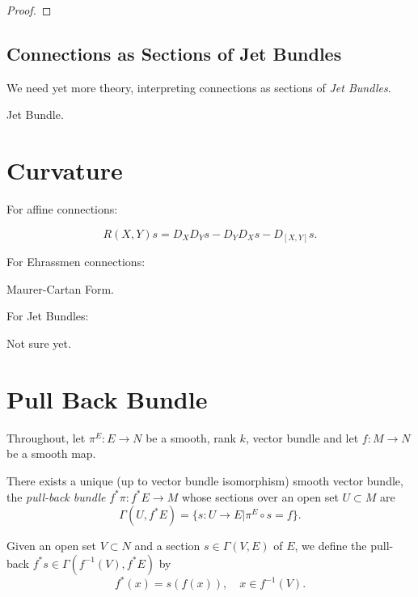 \documentclass{amsart}
\begin{document}
\begin{proof}

\end{proof}

\subsection{Connections as Sections of Jet Bundles}

We need yet more theory, interpreting connections as sections of \emph{Jet Bundles}.

\begin{defn}
Jet Bundle.
\end{defn}

\section{Curvature}

For affine connections:

\begin{defn}
\[
R(X, Y) s = D_X D_Y s - D_Y D_X s - D_{[X, Y]} s.
\]
\end{defn}

For Ehrassmen connections:

\begin{defn}
Maurer-Cartan Form.
\end{defn}

For Jet Bundles:

\begin{defn}
Not sure yet.
\end{defn}

\section{Pull Back Bundle}

Throughout, let \(\pi^E : E \to N\) be a smooth, rank \(k\), vector bundle and let \(f : M \to N\) be a smooth map.

\begin{lemma}
There exists a unique (up to vector bundle isomorphism) smooth vector bundle, the \emph{pull-back bundle} \(f^{\ast} \pi : f^{\ast}E \to M\) whose sections over an open set \(U  \subset M\) are
\[
\Gamma(U, f^{\ast} E) = \{s : U \to E | \pi^E \circ s = f\}.
\]
\end{lemma}

\begin{defn}
Given an open set \(V \subset N\) and a section \(s \in \Gamma(V, E)\) of \(E\), we define the pull-back \(f^{\ast} s \in \Gamma(f^{-1}(V), f^{\ast} E)\) by
\[
f^{\ast} (x) = s(f(x)), \quad x \in f^{-1}(V).
\]
\end{defn}
\end{document}
